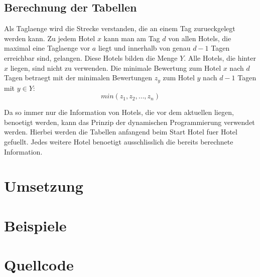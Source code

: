 \documentclass[a4paper,10pt,ngerman]{scrartcl}
\begin{document}
\subsection{Berechnung der Tabellen}
Als Taglaenge wird die Strecke verstanden, die an einem Tag zurueckgelegt werden kann.
Zu jedem Hotel $x$ kann man am Tag $d$ von allen Hotels, die maximal eine Taglaenge vor $a$ liegt und innerhalb von genau $d-1$ Tagen erreichbar sind, gelangen.
Diese Hotels bilden die Menge $Y$.
Alle Hotels, die hinter $x$ liegen, sind nicht zu verwenden.
Die minimale Bewertung zum Hotel $x$ nach $d$ Tagen betraegt mit der minimalen Bewertungen $z_y$ zum Hotel $y$ nach $d-1$ Tagen mit $y\in Y$:
\begin{equation*}
    min(z_1,  z_2, \dots , z_n)
\end{equation*}

Da so immer nur die Information von Hotels, die vor dem aktuellen liegen, benoetigt werden, kann das Prinzip der dynamischen Programmierung verwendet werden.
Hierbei werden die Tabellen anfangend beim Start Hotel fuer Hotel gefuellt.
Jedes weitere Hotel benoetigt ausschlisslich die bereits berechnete Information.

\section{Umsetzung}

\section{Beispiele}

\section{Quellcode}
\end{document}
